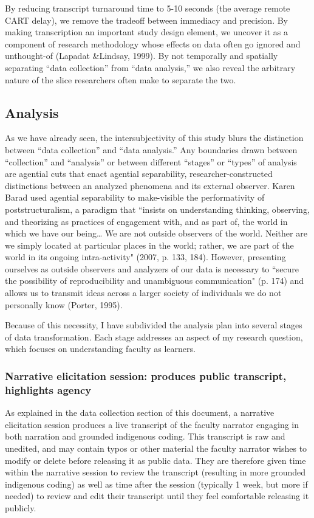 By reducing transcript turnaround time to 5-10 seconds (the average remote CART delay), we remove the tradeoff between immediacy and precision. By making transcription an important study design element, we uncover it as a component of research methodology whose effects on data often go ignored and unthought-of (Lapadat &Lindsay, 1999). By not temporally and spatially separating “data collection” from “data analysis,” we also reveal the arbitrary nature of the slice researchers often make to separate the two.

\subsection{Analysis}

As we have already seen, the intersubjectivity of this study blurs the distinction between “data collection” and “data analysis.” Any boundaries drawn between “collection” and “analysis” or between different “stages” or “types” of analysis are agential cuts that enact agential separability, researcher-constructed distinctions between an analyzed phenomena and its external observer. Karen Barad used agential separability to make-visible the performativity of poststructuralism, a paradigm that “insists on understanding thinking, observing, and theorizing as practices of engagement with, and as part of, the world in which we have our being… We are not outside observers of the world. Neither are we simply located at particular places in the world; rather, we are part of the world in its ongoing intra-activity" (2007, p. 133, 184). However, presenting ourselves as outside observers and analyzers of our data is necessary to “secure the possibility of reproducibility and unambiguous communication" (p. 174) and allows us to transmit ideas across a larger society of individuals we do not personally know (Porter, 1995).

Because of this necessity, I have subdivided the analysis plan into several stages of data transformation. Each stage addresses an aspect of my research question, which focuses on understanding faculty as learners.

\subsubsection{Narrative elicitation session: produces public transcript, highlights agency}

As explained in the data collection section of this document, a narrative elicitation session produces a live transcript of the faculty narrator engaging in both narration and grounded indigenous coding. This transcript is raw and unedited, and may contain typos or other material the faculty narrator wishes to modify or delete before releasing it as public data. They are therefore given time within the narrative session to review the transcript (resulting in more grounded indigenous coding) as well as time after the session (typically 1 week, but more if needed) to review and edit their transcript until they feel comfortable releasing it publicly.

